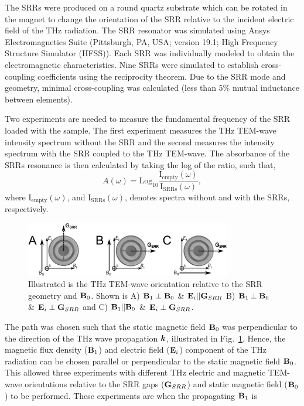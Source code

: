 The SRRs were produced on a round quartz substrate which can be rotated in the magnet to change the orientation of the SRR relative to the incident electric field of the THz radiation. The SRR resonator was simulated using Ansys Electromagnetics Suite (Pittsburgh, PA, USA; version 19.1; High Frequency Structure Simulator (HFSS)). Each SRR was individually modeled to obtain the electromagnetic characteristics. Nine SRRs were simulated to establish cross-coupling coefficients using the reciprocity theorem. Due to the SRR mode and geometry, minimal cross-coupling was calculated (less than 5\% mutual inductance between elements). 

Two experiments are needed to measure the fundamental frequency of the SRR loaded with the sample. The first experiment measures the THz TEM-wave intensity spectrum without the SRR and the second measures the intensity spectrum with the SRR coupled to the THz TEM-wave. The absorbance of the SRRs resonance is then calculated by taking the log of the ratio, such that,
\begin{equation}
  A(\omega) = \text{Log}_{10}\frac{\text{I}_{\text{empty}}(\omega)}{\text{I}_{\text{SRRs}}(\omega)},  
\end{equation}
where $\text{I}_{\text{empty}}(\omega)$, and $\text{I}_{\text{SRRs}}(\omega)$, denotes spectra without and with the SRRs, respectively. 


\begin{figure}[htp]
\centering
  \includegraphics[width=0.8\textwidth]{Kapitel/Ch4-Images/Ch4-BeamPath.eps}
  \caption[THz TEM-wave Orientation Relative to SRR]{Illustrated is the THz TEM-wave orientation relative to the SRR geometry and $\textbf{B}_{0}$. Shown is A) $\textbf{B}_{1} \perp \textbf{B}_{0}$ \& $\textbf{E}_{i}||\textbf{G}_{SRR}$ B) $\textbf{B}_{1} \perp \textbf{B}_{0}$ \& $\textbf{E}_{i}\perp\textbf{G}_{SRR}$ and C) $\textbf{B}_{1} || \textbf{B}_{0}$ \& $\textbf{E}_{i}\perp\textbf{G}_{SRR}$.}
  \label{ch4-fig:BeamGEO}
\end{figure}

The path was chosen such that the static magnetic field $\textbf{B}_{0}$ was perpendicular to the direction of the THz wave propagation $\boldsymbol{k}$, illustrated in Fig.~\ref{ch4-fig:BeamGEO}. Hence, the magnetic flux density ($\textbf{B}_{1}$) and electric field ($\textbf{E}_{i}$) component of the THz radiation can be chosen parallel or perpendicular to the static magnetic field $\textbf{B}_{0}$. This allowed three experiments with different THz electric and magnetic TEM-wave orientations relative to the SRR gaps ($\textbf{G}_{SRR}$) and static magnetic field ($\textbf{B}_{0}$) to be performed. These experiments are when the propagating $\textbf{B}_{1}$ is 

